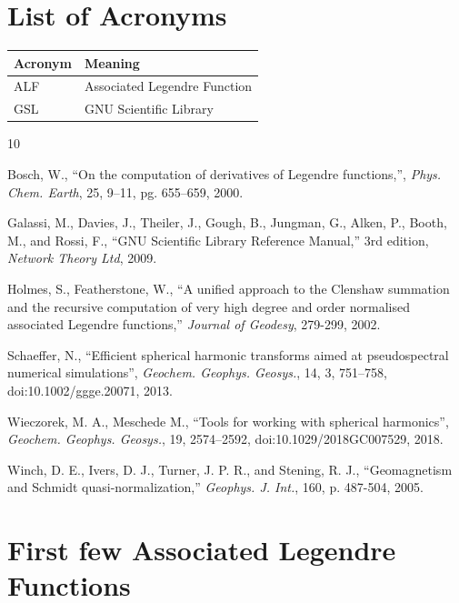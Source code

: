 \documentclass[12pt]{article}
\begin{document}
\section{List of Acronyms}

\begin{tabular}{@{}ll@{}}
\toprule
Acronym & Meaning \\
\midrule
ALF & Associated Legendre Function \\
GSL & GNU Scientific Library \\
\bottomrule
\end{tabular}


\begin{thebibliography}{10}

 Bosch, W., ``On the computation of derivatives of Legendre functions,'', \emph{Phys. Chem. Earth}, 25, 9--11, pg. 655--659, 2000.

 Galassi, M., Davies, J., Theiler, J., Gough, B., Jungman, G., Alken, P., Booth, M., and Rossi, F., ``GNU Scientific Library Reference Manual,'' 3rd edition, \emph{Network Theory Ltd}, 2009.

 Holmes, S., Featherstone, W., ``A unified approach to the Clenshaw summation and the recursive computation of very high degree and order normalised associated Legendre functions,'' \emph{Journal of Geodesy}, 279-299, 2002.

 Schaeffer, N., ``Efficient spherical harmonic transforms aimed at pseudospectral numerical simulations'', \emph{Geochem. Geophys. Geosys.}, 14, 3, 751--758, doi:10.1002/ggge.20071, 2013.

 Wieczorek, M. A., Meschede M., ``Tools for working with spherical harmonics'', \emph{Geochem. Geophys. Geosys.}, 19, 2574--2592, doi:10.1029/2018GC007529, 2018.

 Winch, D. E., Ivers, D. J., Turner, J. P. R., and Stening, R. J., ``Geomagnetism and Schmidt quasi-normalization,'' \emph{Geophys. J. Int.}, 160, p. 487-504, 2005.

\end{thebibliography}

\appendix

\section{First few Associated Legendre Functions}
\end{document}
